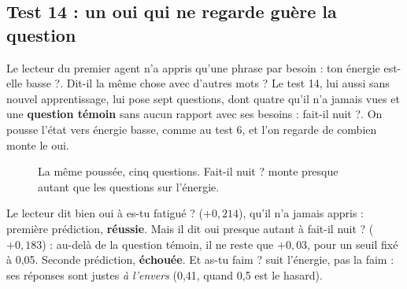 \documentclass[fontsize=10pt,paper=a4,parskip=half-]{scrartcl}
\newcommand{\q}[1]{\og #1\fg{}}
\begin{document}
\subsection{Test 14 : un \q{oui} qui ne regarde guère la question}
Le lecteur du premier agent n'a appris qu'une phrase par besoin : \q{ton énergie est-elle
basse ?}. Dit-il la même chose avec d'autres mots ? Le test 14, lui aussi sans nouvel
apprentissage, lui pose sept questions, dont quatre qu'il n'a jamais vues et une
\textbf{question témoin} sans aucun rapport avec ses besoins : \q{fait-il nuit ?}. On
pousse l'état vers \q{énergie basse}, comme au test 6, et l'on regarde de combien monte
le \q{oui}.

\begin{figure}[h]
\centering
{}
\caption{La même poussée, cinq questions. \q{Fait-il nuit ?} monte presque autant que les
questions sur l'énergie.}
\label{fig:cadran}
\end{figure}

Le lecteur dit bien \q{oui} à \q{es-tu fatigué ?} ($+0,214$), qu'il n'a jamais appris :
première prédiction, \textbf{réussie}. Mais il dit \q{oui} presque autant à \q{fait-il
nuit ?} ($+0,183$) : au-delà de la question témoin, il ne reste que $+0,03$, pour un seuil
fixé à 0,05. Seconde prédiction, \textbf{échouée}. Et \q{as-tu faim ?} suit l'énergie,
pas la faim : ses réponses sont justes \emph{à l'envers} (0,41, quand 0,5 est le hasard).
\end{document}
